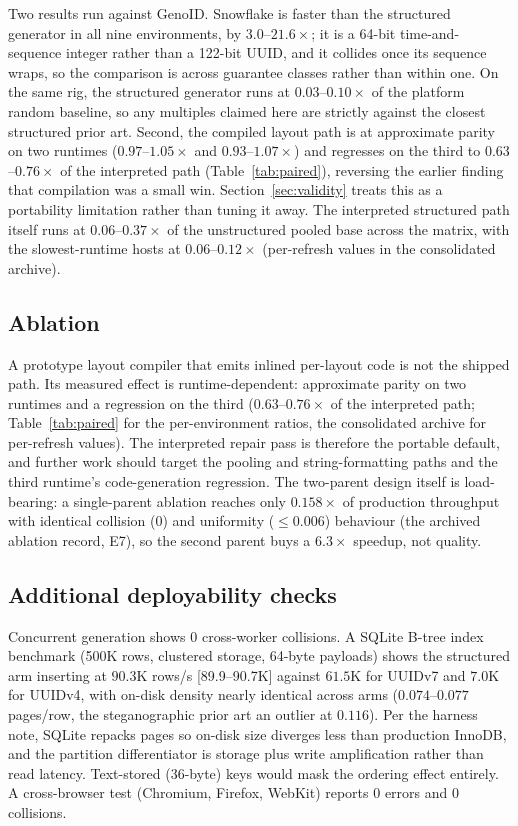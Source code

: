 \documentclass{svproc}
\begin{document}
Two results run against GenoID. Snowflake is faster than the structured generator in all nine environments, by $3.0$--$21.6\times$; it is a 64-bit time-and-sequence integer rather than a 122-bit UUID, and it collides once its sequence wraps, so the comparison is across guarantee classes rather than within one. On the same rig, the structured generator runs at $0.03$--$0.10\times$ of the platform random baseline, so any multiples claimed here are strictly against the closest structured prior art. Second, the compiled layout path is at approximate parity on two runtimes ($0.97$--$1.05\times$ and $0.93$--$1.07\times$) and regresses on the third to $0.63$--$0.76\times$ of the interpreted path (Table~\ref{tab:paired}), reversing the earlier finding that compilation was a small win. Section~\ref{sec:validity} treats this as a portability limitation rather than tuning it away. The interpreted structured path itself runs at $0.06$--$0.37\times$ of the unstructured pooled base across the matrix, with the slowest-runtime hosts at $0.06$--$0.12\times$ (per-refresh values in the consolidated archive).

\subsection{Ablation}
\label{sec:ablation}
A prototype layout compiler that emits inlined per-layout code is not the
shipped path. Its measured effect is runtime-dependent: approximate parity on
two runtimes and a regression on the third ($0.63$--$0.76\times$ of the
interpreted path; Table~\ref{tab:paired} for the per-environment ratios,
the consolidated archive for per-refresh values). The interpreted
repair pass is therefore the portable default, and further work should target
the pooling and string-formatting paths and the third runtime's code-generation
regression. The two-parent design itself is load-bearing: a single-parent
ablation reaches only $0.158\times$ of production throughput with identical
collision (0) and uniformity ($\leq 0.006$) behaviour
(the archived ablation record, E7), so the second parent buys a
$6.3\times$ speedup, not quality.

\subsection{Additional deployability checks}
\label{sec:deployability}
Concurrent generation shows 0 cross-worker collisions. A SQLite B-tree index benchmark (500K rows, clustered storage, 64-byte payloads) shows the structured arm inserting at $90.3$K rows/s [89.9--90.7K] against $61.5$K for UUIDv7 and $7.0$K for UUIDv4, with on-disk density nearly identical across arms ($0.074$--$0.077$ pages/row, the steganographic prior art an outlier at $0.116$). Per the harness note, SQLite repacks pages so on-disk size diverges less than production InnoDB, and the partition differentiator is storage plus write amplification rather than read latency. Text-stored (36-byte) keys would mask the ordering effect entirely. A cross-browser test (Chromium, Firefox, WebKit) reports 0 errors and 0 collisions.
\end{document}
